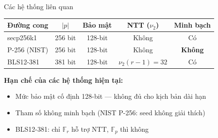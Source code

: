 \begin{frame}{Các hệ thống liên quan}
  \begin{table}
    \small
    \begin{tabular}{lcccc}
      \toprule
      Đường cong & $|p|$ & Bảo mật & NTT ($\nu_2$) & Minh bạch \\
      \midrule
      secp256k1 & 256 bit & 128-bit & Không & Có \\
      P-256 (NIST) & 256 bit & 128-bit & Không & \textcolor{red!70!black}{\textbf{Không}} \\
      BLS12-381 & 381 bit & 128-bit & $\nu_2(r{-}1) = 32$ & Có \\
      \bottomrule
    \end{tabular}
  \end{table}
  \vspace{0.3em}
  \textbf{Hạn chế của các hệ thống hiện tại:}
  \begin{itemize}
    \item Mức bảo mật cố định 128-bit --- không đủ cho kịch bản dài hạn
    \item Tham số không minh bạch (NIST P-256: seed không giải thích)
    \item BLS12-381: chỉ $\mathbb{F}_r$ hỗ trợ NTT, $\mathbb{F}_p$ thì không
  \end{itemize}
\end{frame}
